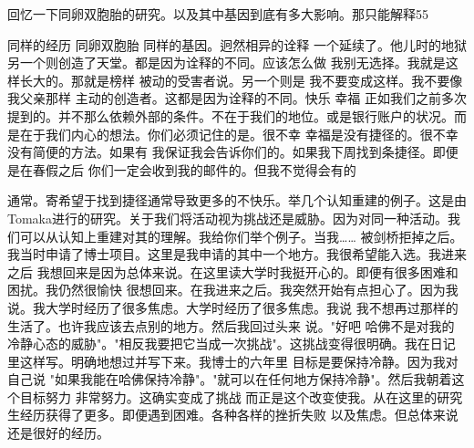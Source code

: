 回忆一下同卵双胞胎的研究。以及其中基因到底有多大影响。那只能解释55%

同样的经历 同卵双胞胎 同样的基因。迥然相异的诠释 一个延续了。他儿时的地狱 另一个则创造了天堂。都是因为诠释的不同。应该怎么做 我别无选择。我就是这样长大的。那就是榜样 被动的受害者说。另一个则是 我不要变成这样。我不要像我父亲那样 主动的创造者。这都是因为诠释的不同。快乐 幸福 正如我们之前多次提到的。并不那么依赖外部的条件。不在于我们的地位。或是银行账户的状况。而是在于我们内心的想法。你们必须记住的是。很不幸 幸福是没有捷径的。很不幸没有简便的方法。如果有 我保证我会告诉你们的。如果我下周找到条捷径。即便是在春假之后 你们一定会收到我的邮件的。但我不觉得会有的 

通常。寄希望于找到捷径通常导致更多的不快乐。举几个认知重建的例子。这是由Tomaka进行的研究。关于我们将活动视为挑战还是威胁。因为对同一种活动。我们可以从认知上重建对其的理解。我给你们举个例子。当我…… 被剑桥拒掉之后。我当时申请了博士项目。这里是我申请的其中一个地方。我很希望能入选。我进来之后 我想回来是因为总体来说。在这里读大学时我挺开心的。即便有很多困难和困扰。我仍然很愉快 很想回来。在我进来之后。我突然开始有点担心了。因为我说。我大学时经历了很多焦虑。大学时经历了很多焦虑。我说 我不想再过那样的生活了。也许我应该去点别的地方。然后我回过头来 说。"好吧 哈佛不是对我的冷静心态的威胁"。"相反我要把它当成一次挑战"。这挑战变得很明确。我在日记里这样写。明确地想过并写下来。我博士的六年里 目标是要保持冷静。因为我对自己说 "如果我能在哈佛保持冷静"。"就可以在任何地方保持冷静"。然后我朝着这个目标努力 非常努力。这确实变成了挑战 而正是这个改变使我。从在这里的研究生经历获得了更多。即便遇到困难。各种各样的挫折失败 以及焦虑。但总体来说 还是很好的经历。 

